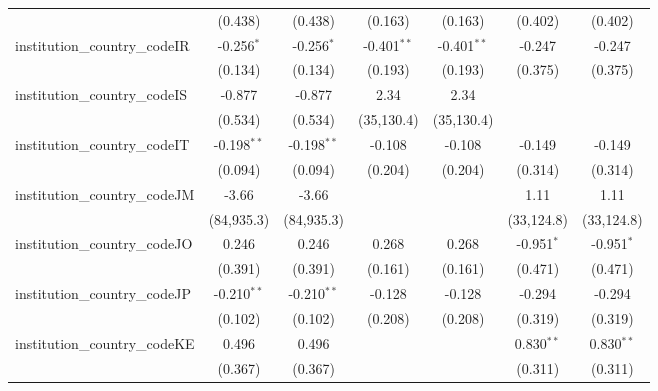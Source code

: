 \begin{tabular}{lcccccc}
                                         & (0.438)        & (0.438)        & (0.163)        & (0.163)        & (0.402)        & (0.402)\\   
   institution\_country\_codeIR          & -0.256$^{*}$   & -0.256$^{*}$   & -0.401$^{**}$  & -0.401$^{**}$  & -0.247         & -0.247\\   
                                         & (0.134)        & (0.134)        & (0.193)        & (0.193)        & (0.375)        & (0.375)\\   
   institution\_country\_codeIS          & -0.877         & -0.877         & 2.34           & 2.34           &                &   \\   
                                         & (0.534)        & (0.534)        & (35,130.4)     & (35,130.4)     &                &   \\   
   institution\_country\_codeIT          & -0.198$^{**}$  & -0.198$^{**}$  & -0.108         & -0.108         & -0.149         & -0.149\\   
                                         & (0.094)        & (0.094)        & (0.204)        & (0.204)        & (0.314)        & (0.314)\\   
   institution\_country\_codeJM          & -3.66          & -3.66          &                &                & 1.11           & 1.11\\   
                                         & (84,935.3)     & (84,935.3)     &                &                & (33,124.8)     & (33,124.8)\\   
   institution\_country\_codeJO          & 0.246          & 0.246          & 0.268          & 0.268          & -0.951$^{*}$   & -0.951$^{*}$\\   
                                         & (0.391)        & (0.391)        & (0.161)        & (0.161)        & (0.471)        & (0.471)\\   
   institution\_country\_codeJP          & -0.210$^{**}$  & -0.210$^{**}$  & -0.128         & -0.128         & -0.294         & -0.294\\   
                                         & (0.102)        & (0.102)        & (0.208)        & (0.208)        & (0.319)        & (0.319)\\   
   institution\_country\_codeKE          & 0.496          & 0.496          &                &                & 0.830$^{**}$   & 0.830$^{**}$\\   
                                         & (0.367)        & (0.367)        &                &                & (0.311)        & (0.311)\\   

\end{tabular}
